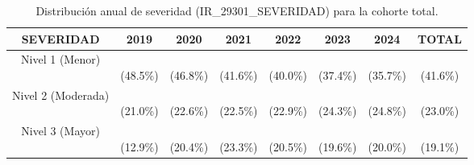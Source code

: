 \begin{table}[htbp]
\centering
\scriptsize
\setlength{\tabcolsep}{4pt}
\renewcommand{\arraystretch}{1.4}
\caption{Distribución anual de severidad (IR\_29301\_SEVERIDAD) para la cohorte total.}
\label{tab:frecuencia_severidad_total}
\begin{tabular}{|c|c|c|c|c|c|c|c|}
\hline
\parbox[t]{4.0cm}{\centering\textbf{SEVERIDAD}} & 
\parbox[t]{1.2cm}{\centering\textbf{2019}} & 
\parbox[t]{1.2cm}{\centering\textbf{2020}} & 
\parbox[t]{1.2cm}{\centering\textbf{2021}} & 
\parbox[t]{1.2cm}{\centering\textbf{2022}} & 
\parbox[t]{1.2cm}{\centering\textbf{2023}} & 
\parbox[t]{1.2cm}{\centering\textbf{2024}} & 
\parbox[t]{1.6cm}{\centering\textbf{TOTAL}} \\ \hline
\parbox[t]{4.0cm}{\raggedright Nivel 1 (Menor)} & \parbox[t]{1.2cm}{\\(48.5\%)} & \parbox[t]{1.2cm}{\\(46.8\%)} & \parbox[t]{1.2cm}{\\(41.6\%)} & \parbox[t]{1.2cm}{\\(40.0\%)} & \parbox[t]{1.2cm}{\\(37.4\%)} & \parbox[t]{1.2cm}{\\(35.7\%)} & \parbox[t]{1.6cm}{\\(41.6\%)} \\ \hline
\parbox[t]{4.0cm}{\raggedright Nivel 2 (Moderada)} & \parbox[t]{1.2cm}{\\(21.0\%)} & \parbox[t]{1.2cm}{\\(22.6\%)} & \parbox[t]{1.2cm}{\\(22.5\%)} & \parbox[t]{1.2cm}{\\(22.9\%)} & \parbox[t]{1.2cm}{\\(24.3\%)} & \parbox[t]{1.2cm}{\\(24.8\%)} & \parbox[t]{1.6cm}{\\(23.0\%)} \\ \hline
\parbox[t]{4.0cm}{\raggedright Nivel 3 (Mayor)} & \parbox[t]{1.2cm}{\\(12.9\%)} & \parbox[t]{1.2cm}{\\(20.4\%)} & \parbox[t]{1.2cm}{\\(23.3\%)} & \parbox[t]{1.2cm}{\\(20.5\%)} & \parbox[t]{1.2cm}{\\(19.6\%)} & \parbox[t]{1.2cm}{\\(20.0\%)} & \parbox[t]{1.6cm}{\\(19.1\%)} \\ \hline

\end{tabular}
\end{table}

